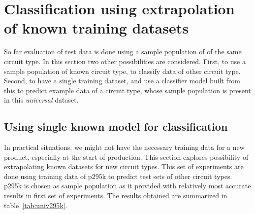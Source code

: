 \section{Classification using extrapolation of known training datasets}
So far evaluation of test data is done using a sample population of of the same circuit type. In this section two other possibilities are considered. First, to use a sample population of known circuit type, to classify data of other circuit type. Second, to have a single training dataset, and use a classifier model built from this to predict example data of a circuit type, whose sample population is present in this \emph{universal} dataset.

\subsection{Using single known model for classification}
In practical situations, we might not have the necessary training data for a new product, especially at the start of production. This section explores possibility of extrapolating known datasets for new circuit types. This set of experiments are done using training data of p295k to predict test sets of other circuit types. p295k is chosen as sample population as it provided with relatively most accurate results in first set of experiments. The results obtained are summarized in table~\ref{tab:univ295k}.

